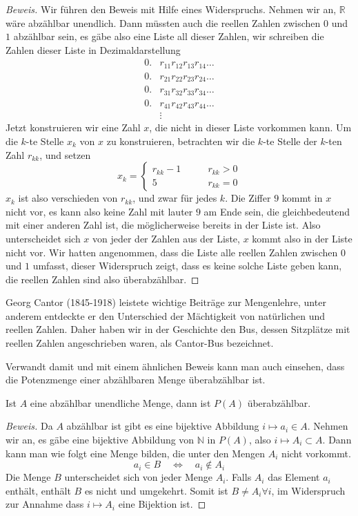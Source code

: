 \begin{proof}[Beweis]
Wir führen den Beweis mit Hilfe eines Widerspruchs. Nehmen wir
an, $\mathbb R$ wäre abzählbar unendlich. Dann müssten auch
die reellen Zahlen zwischen $0$ und $1$ abzählbar sein,  es gäbe also eine
Liste all dieser Zahlen, wir schreiben die Zahlen
dieser Liste in Dezimaldarstellung
\begin{align*}
0.&r_{11}r_{12}r_{13}r_{14}\dots\\
0.&r_{21}r_{22}r_{23}r_{24}\dots\\
0.&r_{31}r_{32}r_{33}r_{34}\dots\\
0.&r_{41}r_{42}r_{43}r_{44}\dots\\
&\vdots
\end{align*}
Jetzt konstruieren wir eine Zahl $x$, die nicht in dieser Liste vorkommen
kann. Um die $k$-te Stelle $x_k$ von $x$ zu konstruieren, betrachten
wir die $k$-te Stelle der $k$-ten Zahl $r_{kk}$, und setzen
\[
x_k=\begin{cases}
r_{kk}-1&\qquad r_{kk}>0\\
5&\qquad r_{kk}=0
\end{cases}
\]
$x_k$ ist also verschieden von $r_{kk}$, und zwar für jedes $k$.
Die Ziffer $9$ kommt in $x$ nicht vor, es kann also keine Zahl
mit lauter $9$ am Ende sein, die gleichbedeutend mit einer anderen
Zahl ist, die möglicherweise bereits in der Liste ist.
Also unterscheidet sich $x$ von jeder der Zahlen aus der Liste, $x$
kommt also in der Liste nicht vor. Wir hatten angenommen, dass die
Liste alle reellen Zahlen zwischen $0$ und $1$ umfasst, dieser
Widerspruch zeigt, dass es keine solche Liste geben kann, die
reellen Zahlen sind also überabzählbar.
\end{proof}

%
Georg Cantor (1845-1918) leistete wichtige Beiträge zur Mengenlehre,
unter anderem entdeckte er den Unterschied der Mächtigkeit von
natürlichen und reellen Zahlen. Daher haben wir in der Geschichte
den Bus, dessen Sitzplätze mit reellen Zahlen angeschrieben waren,
als Cantor-Bus bezeichnet.

Verwandt damit und mit einem ähnlichen Beweis kann man auch einsehen,
dass die Potenzmenge einer abzählbaren Menge überabzählbar ist.

\begin{satz}\label{powersetuncountable}
Ist $A$ eine abzählbar unendliche Menge, dann ist $P(A)$
überabzählbar.
\end{satz}

\begin{proof}[Beweis]
Da $A$ abzählbar ist gibt es eine bijektive Abbildung
$i\mapsto a_i\in A$. Nehmen wir an, es gäbe eine bijektive
Abbildung von $\mathbb N$ in $P(A)$, also $i\mapsto A_i\subset A$.
Dann kann man wie folgt eine Menge bilden, die unter den Mengen
$A_i$ nicht vorkommt.
\[
a_i\in B\quad\Leftrightarrow\quad a_i\not\in A_i
\]
Die Menge $B$ unterscheidet sich von jeder Menge $A_i$. Falls
$A_i$ das Element $a_i$ enthält, enthält $B$ es nicht und
umgekehrt. Somit ist $B\ne A_i\forall i$, im Widerspruch zur Annahme
dass $i\mapsto A_i$ eine Bijektion ist.
\end{proof}

